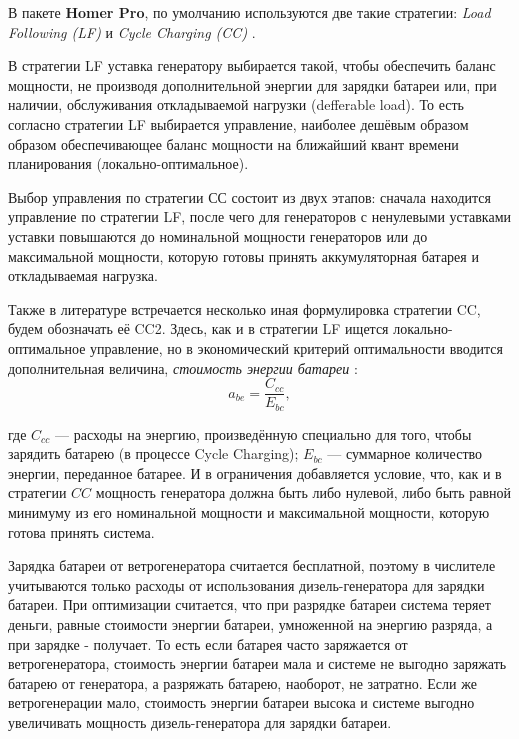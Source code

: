 \documentclass{report}
\begin{document}
В пакете \textbf{Homer Pro}, по умолчанию используются две такие стратегии: \textit{Load Following (LF)} \cite{lf} и \textit{Cycle Charging (CC)} \cite{cc}.

В стратегии LF уставка генератору выбирается такой, чтобы обеспечить баланс мощности, не производя дополнительной энергии для зарядки батареи или, при наличии, обслуживания откладываемой нагрузки (defferable load).
То есть согласно стратегии LF выбирается управление, наиболее дешёвым образом образом обеспечивающее баланс мощности на ближайший квант времени планирования (локально-оптимальное).

Выбор управления по стратегии СС состоит из двух этапов: сначала находится управление по стратегии LF, после чего для генераторов с ненулевыми уставками уставки повышаются до номинальной мощности генераторов или до максимальной мощности, которую готовы принять аккумуляторная батарея и откладываемая нагрузка.

Также в литературе \cite[10]{Aziz2019} встречается несколько иная формулировка стратегии CC, будем обозначать её CC2. 
Здесь, как и в стратегии LF ищется локально-оптимальное управление, но в экономический критерий оптимальности вводится дополнительная величина, \textit{стоимость энергии батареи} \cite{bec}:
\begin{equation}\label{f:bec}
    a_{be} = \frac{C_{cc}}{E_{bc}},
\end{equation}

где $C_{cc}$ --- расходы на энергию, произведённую специально для того, чтобы зарядить батарею (в процессе Cycle Charging); $E_{bc}$ --- суммарное количество энергии, переданное батарее.
И в ограничения добавляется условие, что, как и в стратегии $CC$ мощность генератора должна быть либо нулевой, либо быть равной минимуму из его номинальной мощности и максимальной мощности, которую готова принять система.

Зарядка батареи от ветрогенератора считается бесплатной, поэтому в числителе учитываются только расходы от использования дизель-генератора для зарядки батареи.
При оптимизации считается, что при разрядке батареи система теряет деньги, равные стоимости энергии батареи, умноженной на энергию разряда, а при зарядке - получает.
То есть если батарея часто заряжается от ветрогенератора, стоимость энергии батареи мала и системе не выгодно заряжать батарею от генератора, а разряжать батарею, наоборот, не затратно.
Если же ветрогенерации мало, стоимость энергии батареи высока и системе выгодно увеличивать мощность дизель-генератора для зарядки батареи.
\end{document}
